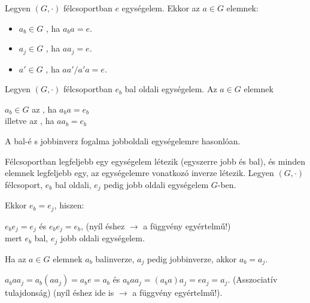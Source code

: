 \begin{frame}
  \begin{tcolorbox}[title={Def.: Balinverz, Jobbinverz, Inverz (Félcsoport)}]
    Legyen $(G, {\cdot})$ félcsoportban $e$ egységelem. Ekkor az $a \in G$ elemnek:\\
    \msmallskip
    
    \begin{itemize}
      \item $a_b \in G$ , ha $a_ba = e$.
      \item $a_j \in G$ , ha $aa_j = e$.
      \item $a' \in G$ , ha $aa' / a'a = e$.
    \end{itemize}
    \mmedskip
    
    Legyen $(G, {\cdot})$ félcsoportban $e_b$ bal oldali egységelem. Az $a \in G$ elemnek \\
    \msmallskip
    
    $a_b \in G$ az , ha $a_ba = e_b$\\
    illetve az , ha $aa_b = e_b$\\
    \mmedskip
    
    A bal-é s jobbinverz fogalma jobboldali egységelemre hasonlóan.
  \end{tcolorbox}
\end{frame}


\begin{frame}
  \begin{tcolorbox}[title={Tétel: Egységelem és inverz félcsoportban}]
    Félcsoportban legfeljebb egy egységelem létezik (egyszerre jobb és bal), és minden elemnek legfeljebb egy, az egységelemre vonatkozó inverze létezik.
  \tcblower
    Legyen $(G, {\cdot})$ félcsoport, $e_b$ bal oldali, $e_j$ pedig jobb oldali egységelem $G$-ben.\\
    \msmallskip
    
    Ekkor $e_b = e_j$, hiszen:\\
    \msmallskip
    
    $e_be_j = e_j$ és $e_be_j = e_b$, (nyíl éshez $\rightarrow$ a függvény egyértelmű!)\\
    mert $e_b$ bal, $e_j$ jobb oldali egységelem.\\
    \msmallskip
    
    Ha az $a \in G$ elemnek $a_b$ balinverze, $a_j$ pedig jobbinverze, akkor $a_b = a_j$.\\
    \msmallskip
    
    $a_baa_j = a_b(aa_j) = a_be = a_b$ és $a_baa_j = (a_ba)a_j = ea_j = a_j$. (Asszociatív tulajdonság) (nyíl éshez ide is $\rightarrow$ a függvény egyértelmű!).
  \end{tcolorbox}
\end{frame}

